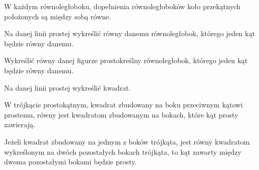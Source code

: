 \begin{euclid_theorem}
    W każdym równoległoboku, dopełnienia równoległoboków koło przekątnych położonych są między sobą równe.
\end{euclid_theorem}

\begin{euclid_theorem}
    Na danej linii prostej wykreślić równy danemu równoległobok, którego jeden kąt będzie równy danemu.
\end{euclid_theorem}

\begin{euclid_theorem}
    Wykreślić równy danej figurze prostokreślny równoległobok, którego jeden kąt będzie równy danemu.
\end{euclid_theorem}

\begin{euclid_theorem}
    Na danej linii prostej wykreślić kwadrat.
\end{euclid_theorem}

\begin{euclid_theorem}
    W trójkącie prostokątnym, kwadrat zbudowany na boku przeciwnym kątowi prostemu, równy jest kwadratom zbudowanym na bokach, które kąt prosty zawierają.
\end{euclid_theorem}

\begin{euclid_theorem}
    Jeżeli kwadrat zbudowany na jednym z boków trójkąta, jest równy kwadratom wykreślonym na dwóch pozostałych bokach trójkąta, to kąt zawarty między dwoma pozostałymi bokami będzie prosty.
\end{euclid_theorem}